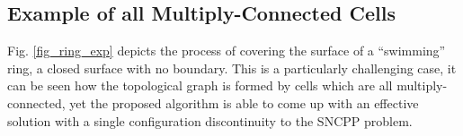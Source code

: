 \documentclass[Afour,sageh,times]{sagej}
\begin{document}
\subsection{Example of all Multiply-Connected Cells}
Fig. \ref{fig_ring_exp} depicts the process of covering the surface of a ``swimming'' ring, a closed surface with no boundary. 
This is a particularly challenging case, it can be seen how the topological graph is formed by cells which are all multiply-connected, 
yet the proposed algorithm is able to come up with an effective solution with a single configuration discontinuity to the SNCPP problem. 

\begin{figure}[t]
\centering
{}

\end{figure}
\end{document}
